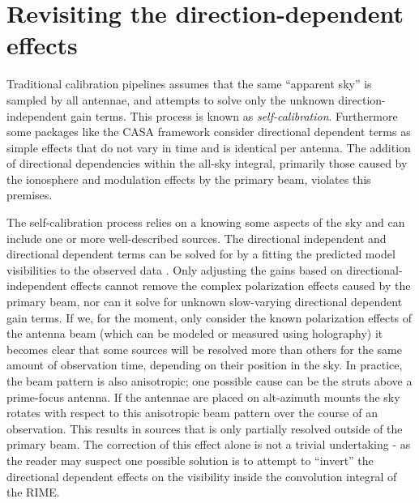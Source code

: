 \section{Revisiting the direction-dependent effects}
Traditional calibration pipelines assumes that the same ``apparent sky'' is sampled by all antennae, and attempts to solve only the unknown direction-independent gain terms.
This process is known as \textit{self-calibration}. Furthermore some packages like the CASA framework consider directional dependent terms as simple effects 
that do not vary in time and is identical per antenna. The addition of directional dependencies within the all-sky integral, primarily those caused by the 
ionosphere and modulation effects by the primary beam, violates this premises. 

The self-calibration process relies on a knowing some aspects of the sky and can include one or more well-described sources. The directional
independent and directional dependent terms can be solved for by a fitting the predicted model visibilities to the observed 
data \cite{noordam2010meqtrees}. Only adjusting the gains based on directional-independent effects cannot remove the complex 
polarization effects caused by the primary beam, nor can it solve for unknown slow-varying directional dependent gain terms. If we, for 
the moment, only consider the known polarization effects of the antenna beam (which can be modeled or measured using holography) it 
becomes clear that some sources will be resolved more than others for the same amount of observation time, 
depending on their position in the sky. In practice, the beam pattern is also anisotropic; one possible cause can be 
the struts above a prime-focus antenna. If the antennae are placed on alt-azimuth mounts the sky rotates with respect 
to this anisotropic beam pattern over the course of an observation. This results in sources that is only partially 
resolved outside of the primary beam. The correction of this effect alone is not a trivial undertaking - 
as the reader may suspect one possible solution is to attempt to ``invert'' the directional dependent effects on the visibility 
inside the convolution integral of the RIME.

